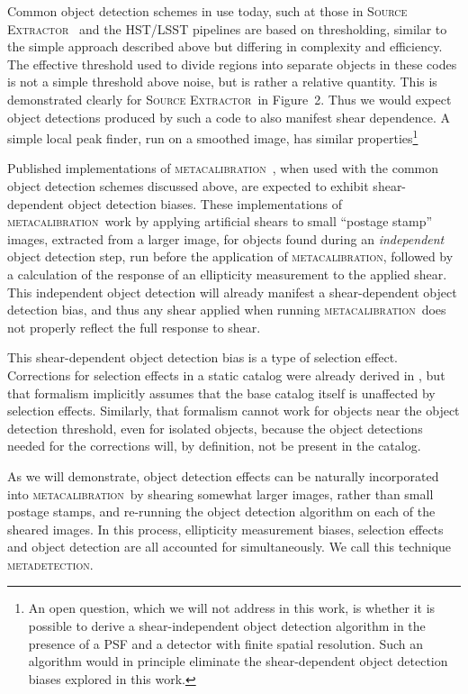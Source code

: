 \documentclass[iop, twocolappendix, appendixfloats, numberedappendix, apj]{hackemulateapj}
\newcommand{\mcal}{\textsc{metacalibration}}
\newcommand{\mdet}{\textsc{metadetection}}
\newcommand{\sx}{\textsc{Source Extractor}}
\begin{document}
Common object detection schemes in use today, such at those in \sx\
\citep{Bertin96} and the HST/LSST pipelines \citep{BoschHSC2018,BoschLSST2018}
are based on thresholding, similar to the simple approach described above but
differing in complexity and efficiency. The effective threshold used to divide
regions into separate objects in these codes is not a simple threshold above
noise, but is rather a relative quantity.  This is demonstrated clearly for
\sx\ in \cite{Bertin96} Figure~2.  Thus we would expect object detections
produced by such a code to also manifest shear dependence. A simple local peak
finder, run on a smoothed image, has similar properties\footnote{An open question,
which we will not address in this work, is whether it is possible to derive a
shear-independent object detection algorithm  in the presence of a PSF and a
detector with finite spatial resolution.  Such an algorithm would in principle
eliminate the shear-dependent object detection biases explored in this work.}

Published implementations of \mcal\
\citep[e.g.,][]{HuffMcal2017,SheldonMcal2017}, when used with the common object
detection schemes discussed above, are expected to exhibit shear-dependent
object detection biases. These implementations of \mcal\ work by applying
artificial shears to small ``postage stamp'' images, extracted from a larger
image, for objects found during an {\em independent} object detection step, run
before the application of \mcal, followed by a calculation of the response of
an ellipticity measurement to the applied shear. This independent object
detection will already manifest a shear-dependent object detection bias, and
thus any shear applied when running \mcal\ does not properly reflect the full
response to shear.

This shear-dependent object detection bias is a type of selection effect.
Corrections for selection effects in a static catalog were already derived in
\cite{SheldonMcal2017}, but that formalism implicitly assumes that the base
catalog itself is unaffected by selection effects.  Similarly, that formalism
cannot work for objects near the object detection threshold, even for isolated
objects, because the object detections needed for the corrections will, by
definition, not be present in the catalog.

As we will demonstrate, object detection effects can be naturally incorporated
into \mcal\ by shearing somewhat larger images, rather than small postage
stamps, and re-running the object detection algorithm on each of the sheared
images. In this process, ellipticity measurement biases, selection effects and
object detection are all accounted for simultaneously. We call this technique
\mdet.
\end{document}
